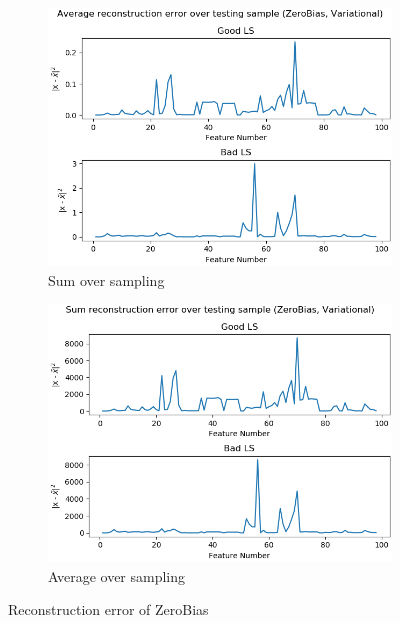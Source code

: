 \begin{figure}[h!]
\centering
    \begin{subfigure}[b]{0.49\linewidth}
        \includegraphics[width=\linewidth]{images/reco/2018/feature_2/avg_sd_Variational_ZeroBias_f2_1.png}
        \caption{Sum over sampling}
    \end{subfigure}
    \begin{subfigure}[b]{0.49\linewidth}
        \includegraphics[width=\linewidth]{images/reco/2018/feature_2/sum_sd_Variational_ZeroBias_f2_1.png}
        \caption{Average over sampling}
    \end{subfigure}
    \caption{Reconstruction error of ZeroBias}
\label{fig:2018_recon_error_zerobias}
\end{figure}

